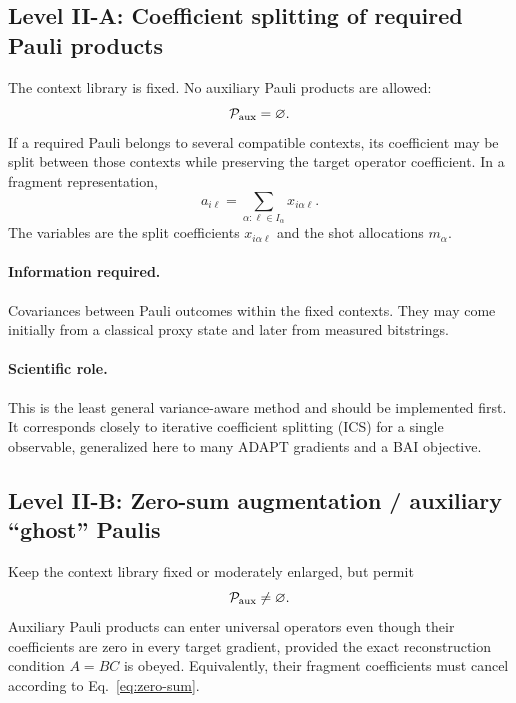 \documentclass[11pt]{article}
\newcommand{\Pset}{\mathcal P}
\begin{document}
\subsection{Level II-A: Coefficient splitting of required Pauli products}

The context library is fixed.  No auxiliary Pauli products are allowed:
\begin{equation}
  \Pset_{\rm aux}=\varnothing.
\end{equation}
If a required Pauli belongs to several compatible contexts, its coefficient may be split between those contexts while preserving the target operator coefficient.  In a fragment representation,
\begin{equation}
  a_{i\ell}=\sum_{\alpha:\ell\in I_\alpha}x_{i\alpha\ell}.
  \label{eq:coeff-split}
\end{equation}
The variables are the split coefficients $x_{i\alpha\ell}$ and the shot allocations $m_\alpha$.

\paragraph{Information required.}
Covariances between Pauli outcomes within the fixed contexts.  They may come initially from a classical proxy state and later from measured bitstrings.

\paragraph{Scientific role.}
This is the least general variance-aware method and should be implemented first.  It corresponds closely to iterative coefficient splitting (ICS) for a single observable, generalized here to many ADAPT gradients and a BAI objective.

\subsection{Level II-B: Zero-sum augmentation / auxiliary ``ghost'' Paulis}

Keep the context library fixed or moderately enlarged, but permit
\begin{equation}
  \Pset_{\rm aux}\neq\varnothing.
\end{equation}
Auxiliary Pauli products can enter universal operators even though their coefficients are zero in every target gradient, provided the exact reconstruction condition $A=BC$ is obeyed.  Equivalently, their fragment coefficients must cancel according to Eq.~\eqref{eq:zero-sum}.
\end{document}
